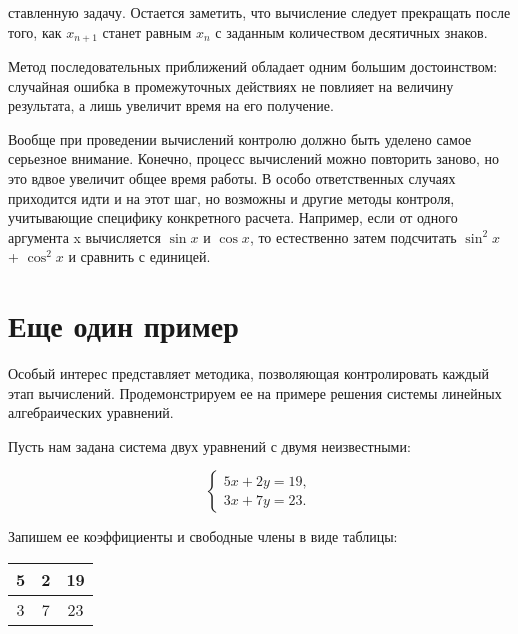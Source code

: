 \twocolumn
\par \noindent ставленную задачу. Остается заметить, что вычисление следует прекращать после того, как $x_{n+1}$ станет равным $x_{n}$ с заданным количеством десятичных знаков.

\par Метод последовательных приближений обладает одним большим достоинством: случайная ошибка в промежуточных действиях не повлияет на величину результата, а лишь увеличит время на его получение.

\par Вообще при проведении вычислений контролю должно быть уделено самое серьезное внимание. Конечно, процесс вычислений можно повторить заново, но это вдвое увеличит общее время работы. В особо ответственных случаях приходится идти и на этот шаг, но возможны и другие методы контроля, учитывающие специфику конкретного расчета. Например, если от одного аргумента x вычисляется $\sin x$ и $\cos x$, то естественно затем подсчитать $\sin^{2}x$ + $\cos^{2}x$ и сравнить с единицей.

\section*{Еще один пример}

\par \noindent Особый интерес представляет методика, позволяющая контролировать каждый этап вычислений. Продемонстрируем ее на примере решения системы линейных алгебраических уравнений.

\par Пусть нам задана система двух уравнений с двумя неизвестными:

    \begin{equation} \tag{4}
     \begin{cases}
       5x + 2y= 19,\\
       3x + 7y = 23.
     \end{cases}
    \end{equation}
    
\par Запишем ее коэффициенты и свободные члены в виде таблицы:

    \begin{center}
        \begin{tabular}{|c|c|c|}
            5 & 2 & 19\\
            \hline
            3 & 7 & 23\\
        \end{tabular}
    \end{center}

